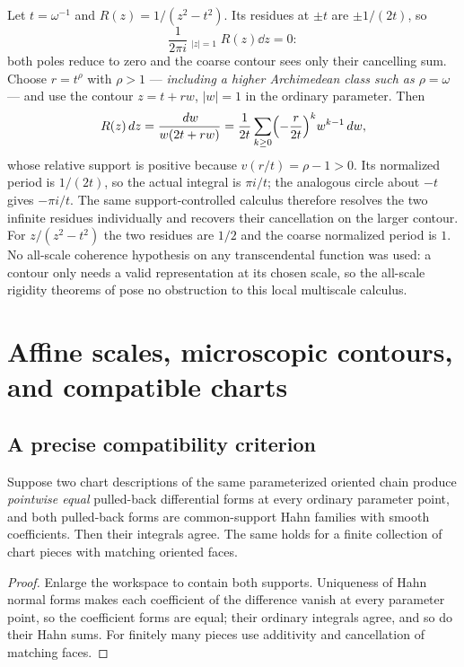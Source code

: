 \documentclass[11pt,letterpaper]{article}
\theoremstyle{definition}
\theoremstyle{remark}
\newcommand{\HCoint}{\mathop{\oint^{\!H}}\nolimits}
\numberwithin{equation}{section}
\begin{document}
\begin{example}
\label{contours:ex:cluster}
Let $t=\omega^{-1}$ and $R(z)=1/(z^2-t^2)$. Its residues at $\pm t$ are
$\pm1/(2t)$, so
\[
  \frac1{2\pi i}\HCoint_{|z|=1}R(z)\dd z=0 :
\]
both poles reduce to zero and the coarse contour sees only their cancelling sum.
Choose $r=t^\rho$ with $\rho>1$ --- \emph{including a higher Archimedean class such
as $\rho=\omega$} --- and use the contour $z=t+rw$, $|w|=1$ in the ordinary
parameter. Then
\begin{equation}\label{contours:eq:clusterpullback}
  R(z)\,d z=\frac{\,d w}{w(2t+rw)}
  =\frac1{2t}\sum_{k\ge0}\Bigl(-\frac{r}{2t}\Bigr)^kw^{k-1}\,d w ,
\end{equation}
whose relative support is positive because $v(r/t)=\rho-1>0$. Its normalized period
is $1/(2t)$, so the actual integral is $\pi i/t$; the analogous circle about $-t$
gives $-\pi i/t$. The same support-controlled calculus therefore resolves the two
infinite residues individually and recovers their cancellation on the larger
contour. For $z/(z^2-t^2)$ the two residues are $1/2$ and the coarse normalized
period is $1$. No all-scale coherence hypothesis on any transcendental function was
used: a contour only needs a valid representation at its chosen scale, so the
all-scale rigidity theorems of \cite{Analysis} pose no obstruction to this local
multiscale calculus.
\end{example}

\section{Affine scales, microscopic contours, and compatible charts}
\label{contours:sec:scales}

\subsection{A precise compatibility criterion}
\begin{proposition}\label{contours:prop:overlap}
Suppose two chart descriptions of the same parameterized oriented chain produce
\emph{pointwise equal} pulled-back differential forms at every ordinary parameter
point, and both pulled-back forms are common-support Hahn families with smooth
coefficients. Then their integrals agree. The same holds for a finite collection of
chart pieces with matching oriented faces.
\end{proposition}
\begin{proof}
Enlarge the workspace to contain both supports. Uniqueness of Hahn normal forms
makes each coefficient of the difference vanish at every parameter point, so the
coefficient forms are equal; their ordinary integrals agree, and so do their Hahn
sums. For finitely many pieces use additivity and cancellation of matching faces.
\end{proof}
\end{document}
